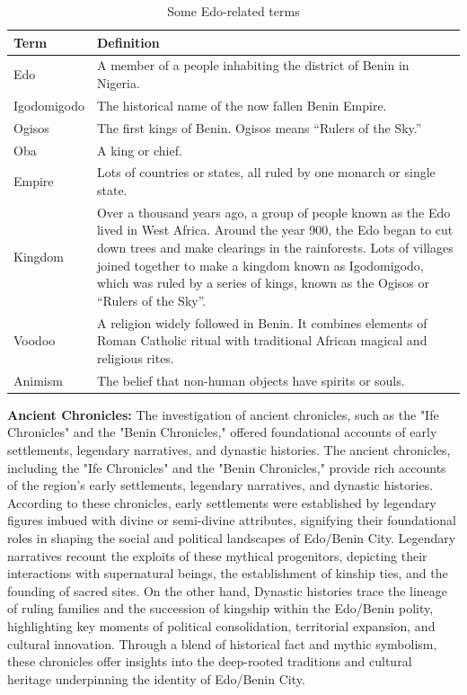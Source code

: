 \begin{table}[htb]
\centering
\caption{Some Edo-related terms}
\label{tab:edo_vocab}
\begin{tabularx}{\linewidth}{|l|X|}
\hline
\textbf{Term} & \textbf{Definition} \\
\hline
Edo & A member of a people inhabiting the district of Benin in Nigeria. \\
\hline
Igodomigodo & The historical name of the now fallen Benin Empire. \\
\hline
Ogisos & The first kings of Benin. Ogisos means “Rulers of the Sky.” \\
\hline
Oba & A king or chief. \\
\hline
Empire & Lots of countries or states, all ruled by one monarch or single state. \\
\hline
Kingdom & Over a thousand years ago, a group of people known as the Edo lived in West Africa. Around the year 900, the Edo began to cut down trees and make clearings in the rainforests. Lots of villages joined together to make a kingdom known as Igodomigodo, which was ruled by a series of kings, known as the Ogisos or “Rulers of the Sky”. \\
\hline
Voodoo & A religion widely followed in Benin. It combines elements of Roman Catholic ritual with traditional African magical and religious rites. \\
\hline
Animism & The belief that non-human objects have spirits or souls. \\
\hline
\end{tabularx}
\end{table}

\vspace{0.5cm} 
\textbf{Ancient Chronicles:} The investigation of ancient chronicles, such as the "Ife Chronicles" and the "Benin Chronicles," offered foundational accounts of early settlements, legendary narratives, and dynastic histories\cite{otterbein1966}. The ancient chronicles, including the "Ife Chronicles" and the "Benin Chronicles," provide rich accounts of the region's early settlements, legendary narratives, and dynastic histories. According to these chronicles, early settlements were established by legendary figures imbued with divine or semi-divine attributes, signifying their foundational roles in shaping the social and political landscapes of Edo/Benin City. Legendary narratives recount the exploits of these mythical progenitors, depicting their interactions with supernatural beings, the establishment of kinship ties, and the founding of sacred sites. On the other hand, Dynastic histories trace the lineage of ruling families and the succession of kingship within the Edo/Benin polity, highlighting key moments of political consolidation, territorial expansion, and cultural innovation. Through a blend of historical fact and mythic symbolism, these chronicles offer insights into the deep-rooted traditions and cultural heritage underpinning the identity of Edo/Benin City.

